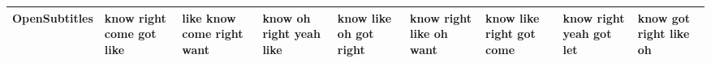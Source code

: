 \documentclass[11pt,a4paper]{article}
\begin{document}
\begin{appendices}
\begin{table}[htp]
\begin{tiny}
\begin{tabular}{|p{}|p{}|p{}|p{}|p{}|p{}|p{}|p{}|p{}|}
OpenSubtitles & know \newline right \newline come \newline got \newline like & like \newline know \newline come \newline right \newline want & know \newline oh \newline right \newline yeah \newline like & know \newline like \newline oh \newline got \newline right & know \newline right \newline like \newline oh \newline want & know \newline like \newline right \newline got \newline come & know \newline right \newline yeah \newline got \newline let & know \newline got \newline right \newline like \newline oh\\\hline

\end{tabular}
\end{tiny}
\end{table}
\end{appendices}
\end{document}
